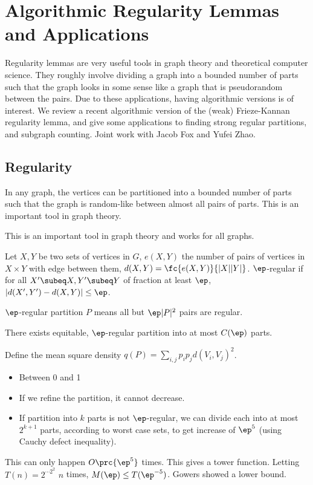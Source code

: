 \section{Algorithmic Regularity Lemmas and Applications}

Regularity lemmas are very useful tools in graph theory and theoretical computer science. They roughly involve dividing a graph into a bounded number of parts such that the graph looks in some sense like a graph that is pseudorandom between the pairs. Due to these applications, having algorithmic versions is of interest. We review a recent algorithmic version of the (weak) Frieze-Kannan regularity lemma, and give some applications to finding strong regular partitions, and subgraph counting. Joint work with Jacob Fox and Yufei Zhao.

\subsection{Regularity}

In any graph, the vertices can be partitioned into a bounded number of parts such that the graph is random-like between almost all pairs of parts. This is an important tool in graph theory.

This is an important tool in graph theory and works for all graphs.

Let $X,Y$ be two sets of vertices in $G$, $e(X,Y)$ the number of pairs of vertices in $X\times Y$ with edge between them, $d(X,Y)=\fc{e(X,Y)}{|X||Y|}$. $\ep$-regular if for all $X'\subeq X, Y'\subeq Y$ of fraction at least $\ep$,  $|d(X',Y')-d(X,Y)|\le \ep$. 

$\ep$-regular partition $P$ means all but $\ep|P|^2$ pairs are regular.

There exists equitable, $\ep$-regular partition into at most $C(\ep)$ parts.

Define the mean square density $q(P) = \sum_{i,j} p_ip_j d(V_i,V_j)^2$. 
\begin{itemize}
\item
Between 0 and 1
\item
If we refine the partition, it cannot decrease.
\item
If partition into $k$ parts is not $\ep$-regular, we can divide each into at most $2^{k+1}$ parts, according to worst case sets, to get increase of $\ep^5$ (using Cauchy defect inequality).
\end{itemize}
This can only happen $O\prc{\ep^5}$ times. This gives a tower function. Letting $T(n)=2^{\cdots 2^2}$ $n$ times, $M(\ep)\le T(\ep^{-5})$. Gowers showed a lower bound.

